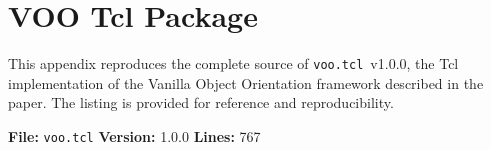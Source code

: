 \section{VOO Tcl Package}
\label{app:voopkg}

This appendix reproduces the complete source of \texttt{voo.tcl}~v1.0.0, the Tcl
implementation of the Vanilla Object Orientation framework described in the paper.
The listing is provided for reference and reproducibility.

\vspace{4pt}
\noindent\textbf{File:} \texttt{voo.tcl} \quad
\textbf{Version:} 1.0.0 \quad
\textbf{Lines:} 767

\vspace{6pt}




\lstset{numbers=none}
